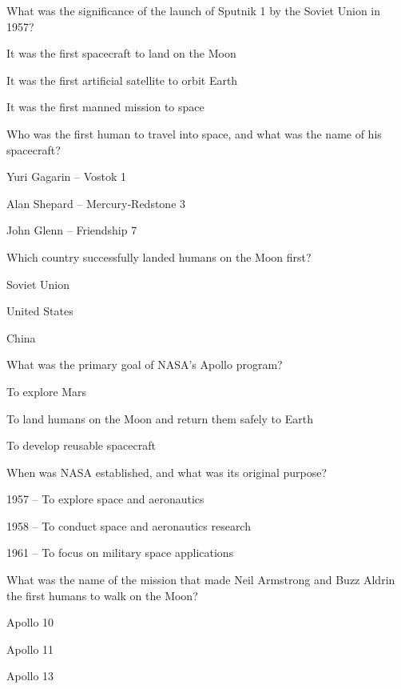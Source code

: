 
\begin{enhancedmcq}{What was the significance of the launch of Sputnik 1 by the Soviet Union in 1957?}
\item It was the first spacecraft to land on the Moon
\item It was the first artificial satellite to orbit Earth
\item It was the first manned mission to space

\end{enhancedmcq}
\begin{enhancedmcq}{Who was the first human to travel into space, and what was the name of his spacecraft?}
\item Yuri Gagarin – Vostok 1
\item Alan Shepard – Mercury‑Redstone 3
\item John Glenn – Friendship 7

\end{enhancedmcq}
\begin{enhancedmcq}{Which country successfully landed humans on the Moon first?}
\item Soviet Union
\item United States
\item China

\end{enhancedmcq}
\begin{enhancedmcq}{What was the primary goal of NASA's Apollo program?}
\item To explore Mars
\item To land humans on the Moon and return them safely to Earth
\item To develop reusable spacecraft

\end{enhancedmcq}
\begin{enhancedmcq}{When was NASA established, and what was its original purpose?}
\item 1957 – To explore space and aeronautics
\item 1958 – To conduct space and aeronautics research
\item 1961 – To focus on military space applications

\end{enhancedmcq}
\begin{enhancedmcq}{What was the name of the mission that made Neil Armstrong and Buzz Aldrin the first humans to walk on the Moon?}
\item Apollo 10
\item Apollo 11
\item Apollo 13

\end{enhancedmcq}

